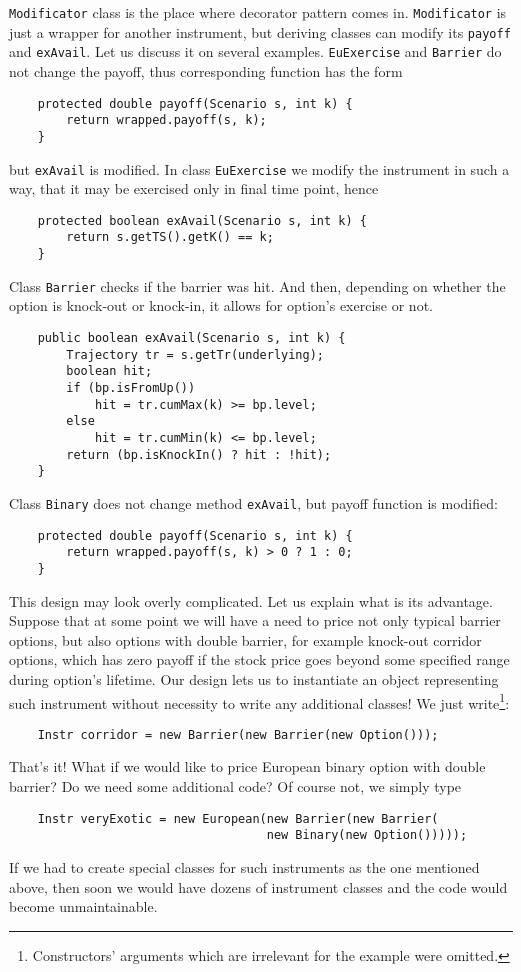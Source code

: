 \documentclass[a4paper,11pt, twoside]{book}
\theoremstyle{definition}
\theoremstyle{remark}
\begin{document}
\texttt{Modificator} class is the place where decorator pattern comes in. \texttt{Modificator} is just a wrapper for another instrument, but deriving classes can modify its \texttt{payoff} and \texttt{exAvail}. Let us discuss it on several examples. \texttt{EuExercise} and \texttt{Barrier} do not change the payoff, thus corresponding function has the form
\begin{lstlisting}
    protected double payoff(Scenario s, int k) {
        return wrapped.payoff(s, k);
    }
\end{lstlisting}
but \texttt{exAvail} is modified. In class \texttt{EuExercise} we modify the instrument in such a way, that it may be exercised only in final time point, hence
\begin{lstlisting}
    protected boolean exAvail(Scenario s, int k) {
        return s.getTS().getK() == k;
    }
\end{lstlisting}
Class \texttt{Barrier} checks if the barrier was hit. And then, depending on whether the option is knock-out or knock-in, it allows for option's exercise or not. 
\begin{lstlisting}
    public boolean exAvail(Scenario s, int k) {
        Trajectory tr = s.getTr(underlying);
        boolean hit;
        if (bp.isFromUp())
            hit = tr.cumMax(k) >= bp.level;
        else
            hit = tr.cumMin(k) <= bp.level;
        return (bp.isKnockIn() ? hit : !hit);
    }
\end{lstlisting}
Class \texttt{Binary} does not change method \texttt{exAvail}, but payoff function is modified:
\begin{lstlisting}
    protected double payoff(Scenario s, int k) {
        return wrapped.payoff(s, k) > 0 ? 1 : 0;
    }
\end{lstlisting}
	
This design may look overly complicated. Let us explain what is its advantage. Suppose that at some point we will have a need to price not only typical barrier options, but also options with double barrier, for example knock-out corridor options, which has zero payoff if the stock price goes beyond some specified range during option's lifetime. Our design lets us to instantiate an object representing such instrument without necessity to write any additional classes! We just write\footnote{Constructors' arguments which are irrelevant for the example were omitted.}:
\begin{lstlisting}
    Instr corridor = new Barrier(new Barrier(new Option()));
\end{lstlisting}
That's it! What if we would like to price European binary option with double barrier? Do we need some additional code? Of course not, we simply type
\begin{lstlisting}
    Instr veryExotic = new European(new Barrier(new Barrier(
                                    new Binary(new Option()))));
\end{lstlisting}
If we had to create special classes for such instruments as the one mentioned above, then soon we would have dozens of instrument classes and the code would become unmaintainable.
	
\end{document}
